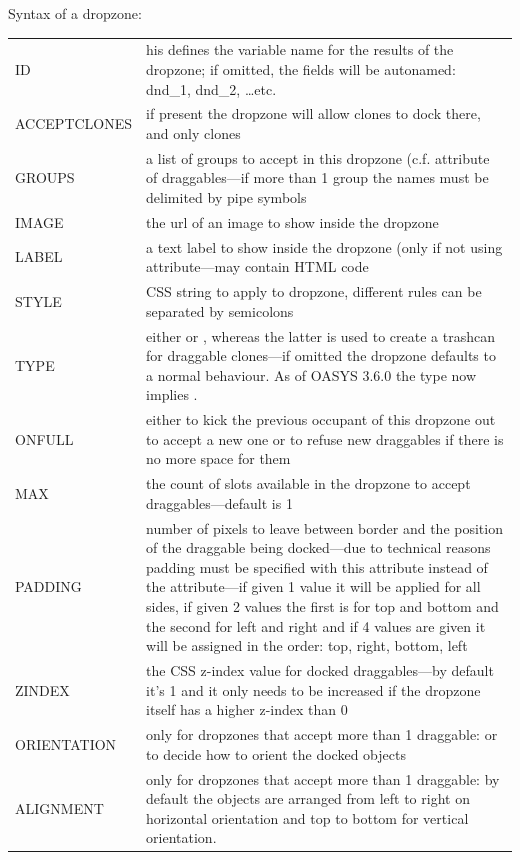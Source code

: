 \documentclass[12pt]{article} %
\newenvironment{keyword}{\leavevmode\color{magenta}}{}
\newenvironment{properties}
	{
    	\footnotesize\renewcommand{\arraystretch}{1.30}
  		\renewcommand{\tabcolsep}{0pt}
   		\begin{longtable}{>{\begin{keyword}}p{3.1cm}<{\end{keyword}}p{13.9cm}}
    	\hline
	}
	{
		\hline\end{longtable}\vspace{5mm}
	}
\begin{document}
Syntax of a dropzone:\hspace{0.5cm}\kw{[@DZ ... @]}

\begin{properties}
\hline
ID & his defines the variable name for the results of the dropzone;
if omitted, the fields will be autonamed: dnd\_1, dnd\_2, \ldots etc. \\
ACCEPTCLONES & if present the dropzone will allow clones to dock there, and only clones \\
GROUPS & a list of groups to accept in this dropzone (c.f. \kw{GROUP} attribute of draggables—if more than 1 group the names must be delimited by pipe symbols\\
IMAGE & the url of an image to show inside the dropzone \\
LABEL & a text label to show inside the dropzone (only if not using \kw{IMAGE} attribute—may contain HTML code\\
STYLE & CSS string to apply to dropzone, different rules can be separated by semicolons \\
TYPE & either \kw{default} or \kw{remove}, whereas the latter is used to create a trashcan for draggable clones—if omitted the dropzone defaults to a normal behaviour. As of OASYS 3.6.0 the type \kw{remove} now implies \kw{ACCEPTCLONES}. \\
ONFULL & either \kw{replace} to kick the previous occupant of this dropzone out to accept a new one or \kw{refuse} to refuse new draggables if there is no more space for them \\
MAX & the count of slots available in the dropzone to accept draggables—default is 1 \\
PADDING & number of pixels to leave between border and the position of the draggable being docked—due to technical reasons padding must be specified with this attribute instead of the \kw{STYLE} attribute—if given 1 value it will be applied for all sides, if given 2 values the first is for top and bottom and the second for left and right and if 4 values are given it will be assigned in the order: top, right, bottom, left \\
ZINDEX & the CSS z-index value for docked draggables—by default it's 1 and it only needs to be increased if the dropzone itself has a higher z-index than 0 \\
ORIENTATION & only for dropzones that accept more than 1 draggable: \kw{vertical} or \kw{horizontal} to decide how to orient the docked objects \\
ALIGNMENT & only for dropzones that accept more than 1 draggable: by default the objects are arranged from left to right on horizontal orientation and top to bottom for vertical orientation.

\end{properties}
\end{document}
